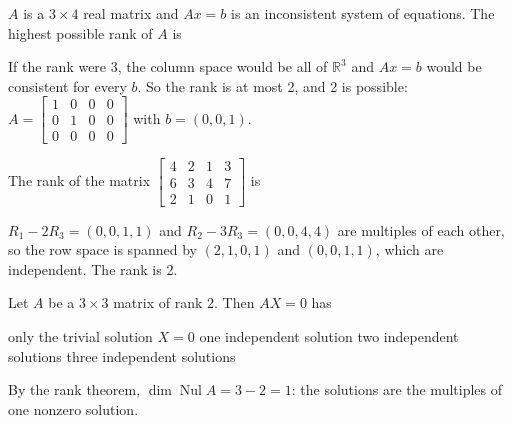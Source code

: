 \begin{question}[id=gate-me2005-1, source=GATE ME 2005, marks=2]
$A$ is a $3 \times 4$ real matrix and $Ax = b$ is an inconsistent system of equations. The highest possible rank of $A$ is
\begin{options}
\end{options}
\begin{solution}
If the rank were 3, the column space would be all of $\mathbb{R}^3$ and $Ax = b$ would be consistent for every $b$. So the rank is at most 2, and 2 is possible: $A = \begin{bmatrix} 1 & 0 & 0 & 0 \\ 0 & 1 & 0 & 0 \\ 0 & 0 & 0 & 0 \end{bmatrix}$ with $b = (0, 0, 1)$.
\end{solution}
\end{question}

\begin{question}[id=gate-ce2003-1, source=GATE CE 2003]
The rank of the matrix $\begin{bmatrix} 4 & 2 & 1 & 3 \\ 6 & 3 & 4 & 7 \\ 2 & 1 & 0 & 1 \end{bmatrix}$ is
\begin{options}
\end{options}
\begin{solution}
$R_1 - 2R_3 = (0, 0, 1, 1)$ and $R_2 - 3R_3 = (0, 0, 4, 4)$ are multiples of each other, so the row space is spanned by $(2, 1, 0, 1)$ and $(0, 0, 1, 1)$, which are independent. The rank is 2.
\end{solution}
\end{question}

\begin{question}[id=gate-in2005-1, source=GATE IN 2005]
Let $A$ be a $3 \times 3$ matrix of rank 2. Then $AX = 0$ has
\begin{options}
  \option only the trivial solution $X = 0$
  \correct one independent solution
  \option two independent solutions
  \option three independent solutions
\end{options}
\begin{solution}
By the rank theorem, $\dim \operatorname{Nul} A = 3 - 2 = 1$: the solutions are the multiples of one nonzero solution.
\end{solution}
\end{question}

